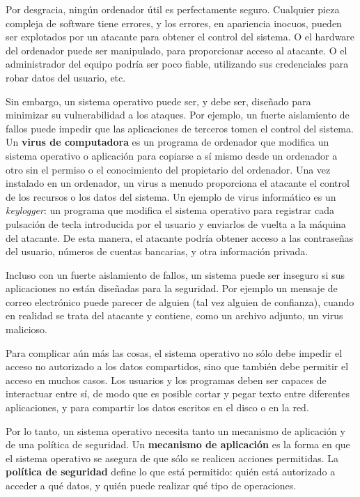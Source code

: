 \documentclass[10pt]{book}
\begin{document}
Por desgracia, ningún ordenador útil es perfectamente seguro. Cualquier pieza compleja de software tiene errores, y los errores, en apariencia inocuos, pueden ser explotados por un atacante para obtener el control del sistema. O el hardware del ordenador puede ser manipulado, para proporcionar acceso al atacante. O el administrador del equipo podría ser poco fiable, utilizando sus credenciales para robar datos del usuario, etc.

Sin embargo, un sistema operativo puede ser, y debe ser, diseñado para minimizar su vulnerabilidad a los ataques. Por ejemplo, un fuerte aislamiento de fallos puede impedir que las aplicaciones de terceros tomen el control del sistema. Un \textbf{virus de computadora} es un programa de ordenador que modifica un sistema operativo o aplicación para copiarse a sí mismo desde un ordenador a otro sin el permiso o el conocimiento del propietario del ordenador. Una vez instalado en un ordenador, un virus a menudo proporciona el atacante el control de los recursos o los datos del sistema. Un ejemplo de virus informático es un \textit{keylogger}: un programa que modifica el sistema operativo para registrar cada pulsación de tecla introducida por el usuario y enviarlos de vuelta a la máquina del atacante. De esta manera, el atacante podría obtener acceso a las contraseñas del usuario, números de cuentas bancarias, y otra información privada.

Incluso con un fuerte aislamiento de fallos, un sistema puede ser inseguro si sus aplicaciones no están diseñadas para la seguridad. Por ejemplo un mensaje de correo electrónico puede parecer de alguien (tal vez alguien de confianza), cuando en realidad se trata del atacante y contiene, como un archivo adjunto, un virus malicioso.

Para complicar aún más las cosas, el sistema operativo no sólo debe impedir el acceso no autorizado a los datos compartidos, sino que también debe permitir el acceso en muchos casos. Los usuarios y los programas deben ser capaces de interactuar entre sí, de modo que es posible cortar y pegar texto entre diferentes aplicaciones, y para compartir los datos escritos en el disco o en la red.

Por lo tanto, un sistema operativo necesita tanto un mecanismo de aplicación y de una política de seguridad. Un \textbf{mecanismo de aplicación} es la forma en que el sistema operativo se asegura de que sólo se realicen acciones permitidas. La \textbf{política de seguridad} define lo que está permitido: quién está autorizado a acceder a qué datos, y quién puede realizar qué tipo de operaciones.
\end{document}
